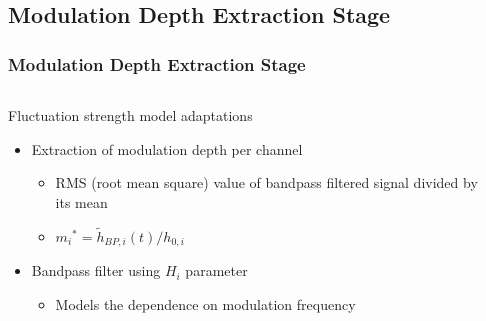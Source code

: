 \documentclass{beamer}
\newcommand{\addroughnessmodel}{%
  \resizebox{!}{7.5cm}{}
}
\newcommand{\addroughnessnode}{%
  \node[anchor=south west,inner sep=0] at (5.5mm,1mm) {
    \addroughnessmodel{}
  };
}
\begin{document}
\subsection{Modulation Depth Extraction Stage}
\begin{frame}
  \frametitle{Modulation Depth Extraction Stage}
  \begin{columns}
    \begin{column}{0.5\textwidth}
      Fluctuation strength model adaptations
      \begin{itemize}
        \item<1-> Extraction of modulation depth per channel
        \begin{itemize}
          \item<2-> RMS (root mean square) value of bandpass filtered signal
            divided by its mean
          \item<3-> ${m_i}^* = \tilde{h}_{BP,i}(t)/h_{0,i}$
        \end{itemize}
        \item<4-> Bandpass filter using $H_i$ parameter
        \begin{itemize}
          \item<5-> Models the dependence on modulation frequency
        \end{itemize}
      \end{itemize}
    \end{column}
    \begin{column}{0.5\textwidth}
    \end{column}
  \end{columns}
\end{frame}
\end{document}
